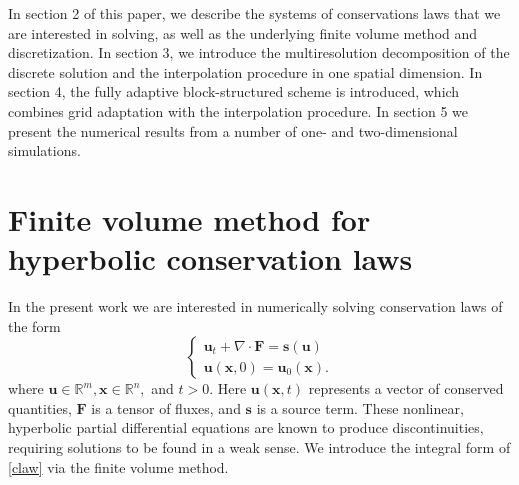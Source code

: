 \documentclass[]{article}
\begin{document}
    In section 2 of this paper, we describe the systems of conservations laws
    that we are interested in solving, as well as the underlying finite volume
    method and discretization.  In section 3, we introduce the multiresolution
    decomposition of the discrete solution and the interpolation procedure in
    one spatial dimension. In section 4, the fully adaptive block-structured
    scheme is introduced, which combines grid adaptation with the interpolation
    procedure. In section 5 we present the numerical results from a number of
    one- and two-dimensional simulations.

\section{Finite volume method for hyperbolic conservation laws}

    In the present work we are interested in numerically solving conservation
    laws of the form
    \begin{equation}
    \begin{cases}
        \bm{u}_{t} + \nabla \cdot \bm{F} = \bm{s}(\bm{u}) \\
        \bm{u}(\bm{x},0) = \bm{u}_{0}(\bm{x}).
    \end{cases}
    \label{claw}
    \end{equation}
    where $\bm{u} \in \mathbb{R}^{m}, \bm{x} \in \mathbb{R}^{n},$ and $t > 0$.
    Here $\bm{u}(\bm{x},t)$ represents a vector of conserved quantities,
    $\bm{F}$ is a tensor of fluxes, and $\bm{s}$ is a source term. These
    nonlinear, hyperbolic partial differential equations are known to produce
    discontinuities, requiring solutions to be found in a weak sense.
    We introduce the integral form of \ref{claw} via the finite volume method.
\end{document}

